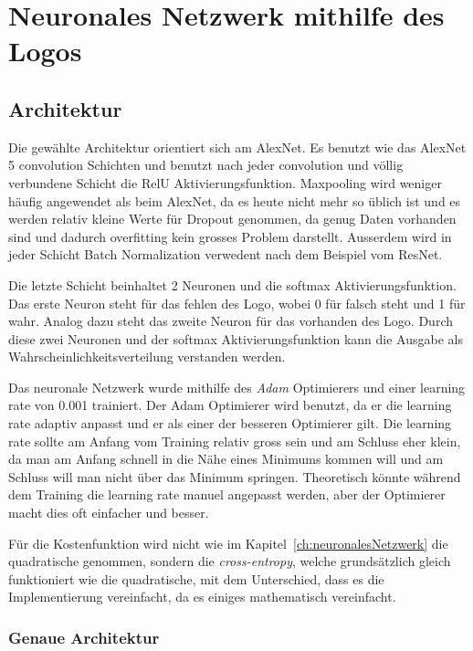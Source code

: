 \documentclass[12pt,a4paper]{report}
\begin{document}
\section{Neuronales Netzwerk mithilfe des Logos}
\subsection{Architektur}
Die gewählte Architektur orientiert sich am AlexNet\cite{alex}.
Es benutzt wie das AlexNet 5 convolution Schichten und benutzt nach jeder convolution und völlig verbundene
Schicht die RelU Aktivierungsfunktion.
Maxpooling wird weniger häufig angewendet als beim AlexNet, da es heute nicht mehr so üblich ist\cite{conv} und
es werden relativ kleine Werte für Dropout genommen, da genug Daten vorhanden sind und dadurch overfitting kein grosses Problem darstellt.
Ausserdem wird in jeder Schicht Batch Normalization verwedent nach dem Beispiel vom ResNet\cite{conv}.

Die letzte Schicht beinhaltet 2 Neuronen und die softmax Aktivierungsfunktion.
Das erste Neuron steht für das fehlen des Logo, wobei 0 für falsch steht und 1 für wahr.
Analog dazu steht das zweite Neuron für das vorhanden des Logo.
Durch diese zwei Neuronen und der softmax Aktivierungsfunktion kann die Ausgabe als Wahrscheinlichkeitsverteilung verstanden werden.

Das neuronale Netzwerk wurde mithilfe des \textit{Adam} Optimierers\cite{adam} und einer learning rate von 0.001 trainiert.
Der Adam Optimierer wird benutzt, da er die learning rate adaptiv anpasst und er als einer der besseren Optimierer gilt\cite{adam}.
Die learning rate sollte am Anfang vom Training relativ gross sein und am Schluss eher klein, da man am Anfang schnell in die Nähe eines Minimums kommen will
und am Schluss will man nicht über das Minimum springen.
Theoretisch könnte während dem Training die learning rate manuel angepasst werden, aber der Optimierer macht dies oft einfacher und besser.

Für die Kostenfunktion wird nicht wie im Kapitel~\ref{ch:neuronalesNetzwerk} die quadratische genommen,
sondern die \textit{cross-entropy}\cite{softmax}, welche grundsätzlich gleich funktioniert wie die quadratische, mit dem Unterschied,
dass es die Implementierung vereinfacht, da es einiges mathematisch vereinfacht\cite{softmax}.

\subsubsection{Genaue Architektur}
\end{document}
